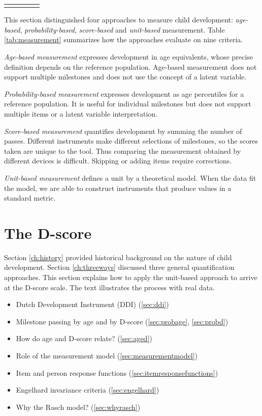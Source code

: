 \documentclass[
]{book}
\providecommand{\tightlist}{%
  \setlength{\itemsep}{0pt}\setlength{\parskip}{0pt}}
\begin{document}
\begin{longtable}[c]{ccccc}
\noalign{\global\setlength{\arrayrulewidth}{2pt}}\arrayrulecolor[HTML]{666666}\cline{1-5}

\end{longtable}

This section distinguished four approaches to measure child development: \emph{age-based}, \emph{probability-based}, \emph{score-based} and \emph{unit-based} measurement. Table \ref{tab:measurement} summarizes how the approaches evaluate on nine criteria.

\emph{Age-based measurement} expresses development in age equivalents, whose precise definition depends on the reference population. Age-based measurement does not support multiple milestones and does not use the concept of a latent variable.

\emph{Probability-based measurement} expresses development as age percentiles for a reference population. It is useful for individual milestones but does not support multiple items or a latent variable interpretation.

\emph{Score-based measurement} quantifies development by summing the number of passes. Different instruments make different selections of milestones, so the scores taken are unique to the tool. Thus comparing the measurement obtained by different devices is difficult. Skipping or adding items require corrections.

\emph{Unit-based measurement} defines a unit by a theoretical model. When the data fit the model, we are able to construct instruments that produce values in a standard metric.

\newpage

\hypertarget{ch:newmodel}{%
\chapter{The D-score}\label{ch:newmodel}}

Section \ref{ch:history} provided historical background on the nature of child development. Section \ref{ch:threeways} discussed three general quantification approaches. This section explains how to apply the unit-based approach to arrive at the D-score scale. The text illustrates the process with real data.

\begin{itemize}
\tightlist
\item
  Dutch Development Instrument (DDI) (\ref{sec:ddi})
\item
  Milestone passing by age and by D-score (\ref{sec:probage}, \ref{sec:probd})
\item
  How do age and D-score relate? (\ref{sec:aged})
\item
  Role of the measurement model (\ref{sec:measurementmodel})
\item
  Item and person response functions (\ref{sec:itemresponsefunctions})
\item
  Engelhard invariance criteria (\ref{sec:engelhard})
\item
  Why the Rasch model? (\ref{sec:whyrasch})
\end{itemize}
\end{document}
